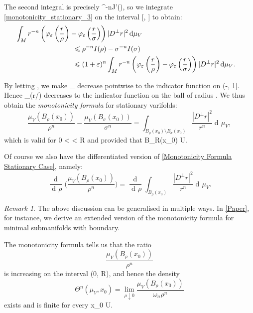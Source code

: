 \documentclass[a4paper, 11pt]{article}
\theoremstyle{plain}
\theoremstyle{definition}
\theoremstyle{remark}
\newtheorem*{remark}{Remark}
\DeclareMathOperator{\diff}{d \!}
\numberwithin{equation}{subsection}
\def\({}
\def\){}
\begin{document}
The second integral is precisely \(\rho^{-n}J'(\rho)\), so we integrate \eqref{monotonicity_stationary_3} on the interval \([\sigma, \rho]\) to obtain:
\begin{align}
\int_{M}r^{-n}\left(\varphi_{\varepsilon}\left(\frac{r}{\rho}\right) - \varphi_{\varepsilon}\left(\frac{r}{\sigma}\right)\right)|D^{\perp}r|^{2}\diff\mu_{V} \hspace{-100pt} \\
&\leqslant \rho^{-n}I(\rho) - \sigma^{-n}I(\sigma) \\
&\leqslant (1+\varepsilon)^n\int_{M}r^{-n}\left(\varphi_{\varepsilon}\left(\frac{r}{\rho}\right) - \varphi_{\varepsilon} \left(\frac{r}{\sigma}\right)\right)|D^{\perp}r|^{2}\diff\mu_{V}.
\end{align}

By letting \(\varepsilon {}\), we make \(\varphi_{\varepsilon}\) decrease pointwise to the indicator function on \((-\infty, 1]\). Hence \(\varphi_{\varepsilon}(r/\rho)\) decreases to the indicator function on the ball of radius \(\rho\). We thus obtain the \emph{monotonicity formula} for stationary varifolds:
\begin{equation}
\label{Monotonicity Formula Stationary Case}
\frac{\mu_{V}(B_{\rho}(x_0))}{\rho^{n}} - \frac{\mu_{V}(B_{\sigma}(x_0))}{\sigma^{n}} = \int_{B_{\rho}(x_0) \setminus B_{\sigma}(x_0)}\frac{|D^{\perp}r|^2}{r^{n}}\diff\mu_{V},
\end{equation}
which is valid for \(0 < \sigma \leqslant \rho < R\) and provided that \(B_{R}(x_0) \subset U\).

Of course we also have the differentiated version of \eqref{Monotonicity Formula Stationary Case}, namely:
\begin{equation}
\frac{\!\diff}{\diff\rho}\bigg(\frac{\mu_{V}(B_{\rho}(x_0))}{\rho^{n}}\bigg) = \frac{\!\diff}{\diff\rho}\int_{B_{\rho}(x_0)}\frac{|D^{\perp}r|^2}{r^{n}}\diff\mu_{V}.
\end{equation}

\begin{remark}
The above discussion can be generalised in multiple ways. In \cref{Paper}, for instance, we derive an extended version of the monotonicity formula for minimal submanifolds with boundary.
\end{remark}

The monotonicity formula tells us that the ratio
\begin{equation}
\frac{\mu_{V}(B_{\rho}(x_0))}{\rho^{n}}
\end{equation}
is increasing on the interval \((0, R)\), and hence the density
\begin{equation}
\Theta^{n}(\mu_V, x_0) = \lim_{\rho \downarrow 0} \frac{\mu_{V}(B_{\rho}(x_0))}{\omega_{n}\rho^{n}}
\end{equation}
exists and is finite for every \(x_0 \in U\).
\end{document}
